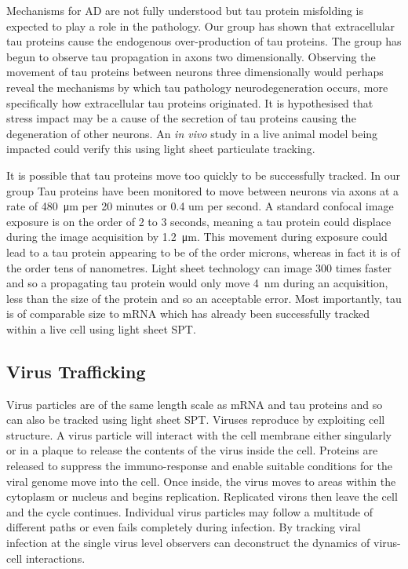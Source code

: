 Mechanisms for AD are not fully understood but tau protein misfolding is expected to play a role in the pathology\cite{LaFerla2008}.
Our group has shown that extracellular tau proteins cause the endogenous over-production of tau proteins\cite{Michel2014a}.
The group has begun to observe tau propagation in axons two dimensionally.
Observing the movement of tau proteins between neurons three dimensionally would perhaps reveal the mechanisms by which tau pathology neurodegeneration occurs, more specifically how extracellular tau proteins originated.
It is hypothesised that stress impact may be a cause of the secretion of tau proteins causing the degeneration of other neurons\cite{Gavett2011,Patterson2014a}.
An \textit{in vivo} study in a live animal model being impacted could verify this using light sheet particulate tracking.

It is possible that tau proteins move too quickly to be successfully tracked.
In our group Tau proteins have been monitored to move between neurons via axons at a rate of \SI{480}{\micro\meter} per 20 minutes or 0.4 um per second.
A standard confocal image exposure is on the order of 2 to 3 seconds, meaning a tau protein could displace during the image acquisition by \SI{1.2}{\micro\meter}.
This movement during exposure could lead to a tau protein appearing to be of the order microns, whereas in fact it is of the order tens of nanometres.
Light sheet technology can image \SI{300}{} times faster and so a propagating tau protein would only move \SI{4}{\nano\meter} during an acquisition, less than the size of the protein and so an acceptable error.
Most importantly, tau is of comparable size to mRNA which has already been successfully tracked within a live cell using light sheet SPT\cite{Spille2015a}.

\subsection{Virus Trafficking}

Virus particles are of the same length scale as mRNA and tau proteins and so can also be tracked using light sheet SPT.
Viruses reproduce by exploiting cell structure.
A virus particle will interact with the cell membrane either singularly or in a plaque to release the contents of the virus inside the cell.
Proteins are released to suppress the immuno-response and enable suitable conditions for the viral genome move into the cell.
Once inside, the virus moves to areas within the cytoplasm or nucleus and begins replication.
Replicated virons then leave the cell and the cycle continues.
Individual virus particles may follow a multitude of different paths or even fails completely during infection.
By tracking viral infection at the single virus level observers can deconstruct the dynamics of virus-cell interactions.

